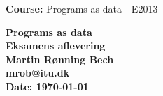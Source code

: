 \documentclass[a4paper,11pt]{article}
\begin{document}

\begin{titlepage}
\begin{flushleft}
\textbf{Course:} Programs as data - E2013
\end{flushleft}
\vspace{30mm}
\centering \parindent=0pt
\Huge\bfseries
Programs as data\\[0.7cm]
\large Eksamens aflevering\\
\vspace{20mm}
    Martin Rønning Bech 
\\  mrob@itu.dk\\
\vspace{50mm}
Date: \today
\end{titlepage}


\end{document}
